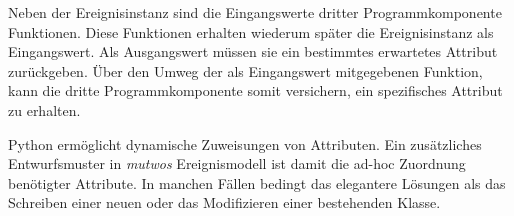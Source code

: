 \documentclass[12pt,a4paper,ngerman]{article}
\begin{document}
\hspace{-0.5cm}

Neben der Ereignisinstanz sind die Eingangswerte dritter Programmkomponente Funktionen.
Diese Funktionen erhalten wiederum später die Ereignisinstanz als Eingangswert.
Als Ausgangswert müssen sie ein bestimmtes erwartetes Attribut zurückgeben.
Über den Umweg der als Eingangswert mitgegebenen Funktion, kann die dritte Programmkomponente somit versichern, ein spezifisches Attribut zu erhalten.

\bigskip

Python ermöglicht dynamische Zuweisungen von Attributen.
Ein zusätzliches Entwurfsmuster in \emph{mutwos} Ereignismodell ist damit die ad-hoc Zuordnung benötigter Attribute.
In manchen Fällen bedingt das elegantere Lösungen als das Schreiben einer neuen oder das Modifizieren einer bestehenden Klasse.
\end{document}
